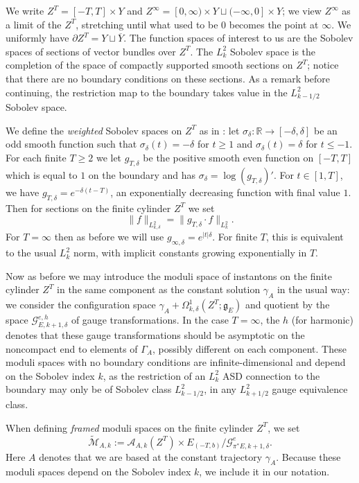 \documentclass{memo-l}
\newcommand{\pE}{\pi^* \! E}
\theoremstyle{definition}
\theoremstyle{remark}
\numberwithin{section}{chapter}
\numberwithin{equation}{chapter}
\begin{document}
We write $Z^T = [-T, T] \times Y$ and $Z^\infty = [0, \infty) \times Y \sqcup (-\infty, 0] \times Y$; we view $Z^\infty$ as a limit of the $Z^T$, stretching until what used to be $0$ becomes the point at $\infty$. We uniformly have $\partial Z^T = Y \sqcup \overline Y$. The function spaces of interest to us are the Sobolev spaces of sections of vector bundles over $Z^T$. The $L^2_k$ Sobolev space is the completion of the space of compactly supported smooth sections on $Z^T$; notice that there are no boundary conditions on these sections. As a remark before continuing, the restriction map to the boundary takes value in the $L^2_{k-1/2}$ Sobolev space.

We define the \emph{weighted} Sobolev spaces on $Z^T$ as in \cite[Page~72]{Lin}: let $\sigma_\delta: \mathbb R \to [-\delta, \delta]$ be an odd smooth function such that $\sigma_\delta(t) = -\delta$ for $t \geq 1$ and $\sigma_\delta(t) = \delta$ for $t \leq -1$. For each finite $T \geq 2$ we let $g_{T,\delta}$ be the positive smooth even function on $[-T, T]$ which is equal to $1$ on the boundary and has $\sigma_\delta = \log(g_{T,\delta})'$. For $t \in [1, T]$, we have $g_{T,\delta} = e^{-\delta(t-T)}$, an exponentially decreasing function with final value $1$. Then for sections on the finite cylinder $Z^T$ we set 
$$\|f\|_{L^2_{k,\delta}} = \|g_{T, \delta} \cdot f\|_{L^2_k}.$$ 
For $T = \infty$ then as before we will use $g_{\infty, \delta} = e^{|t|\delta}$. For finite $T$, this is equivalent to the usual $L^2_k$ norm, with implicit constants growing exponentially in $T$. 

Now as before we may introduce the moduli space of instantons on the finite cylinder $Z^T$ in the same component as the constant solution $\gamma_A$ in the usual way: we consider the configuration space $\gamma_A + \Omega^1_{k,\delta}(Z^T;\mathfrak g_E)$ and quotient by the space $\mathcal G^{e,h}_{E,k+1,\delta}$ of gauge transformations. In the case $T = \infty$, the $h$ (for harmonic) denotes that these gauge transformations should be asymptotic on the noncompact end to elements of $\Gamma_A$, possibly different on each component. 
These moduli spaces with no boundary conditions are infinite-dimensional and depend on the Sobolev index $k$, as the restriction of an $L^2_k$ ASD connection to the boundary may only be of Sobolev class $L^2_{k-1/2}$, in any $L^2_{k+1/2}$ gauge equivalence class.

When defining \emph{framed} moduli spaces on the finite cylinder $Z^T$, we set 
$$\widetilde{\mathcal M}_{A,k} := \mathcal A_{A,k}(Z^T) \times E_{(-T,b)}\big/ \mathcal G^{e}_{\pE,k+1,\delta}.$$ 
Here $A$ denotes that we are based at the constant trajectory $\gamma_A$. Because these moduli spaces depend on the Sobolev index $k$, we include it in our notation.
\end{document}
